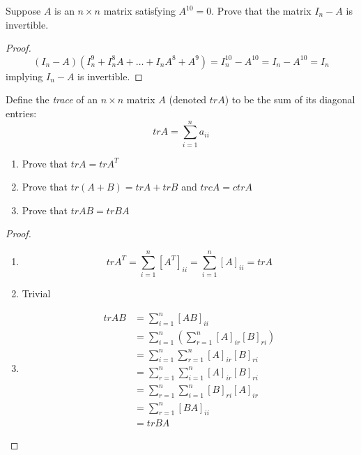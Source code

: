 \begin{exercise} \label{e1.4.21}
    Suppose \( A \) is an \( n \times n \) matrix satisfying \( A^{10} = 0 \). Prove that the matrix \( I_n - A \) is invertible.
    
    \begin{proof}
        \[ (I_n - A)(I_n^9 + I_n^8A + \ldots + I_nA^8 + A^9) = I_n^{10} - A^{10} = I_n - A^{10} = I_n  \]
        implying \( I_n - A \) is invertible.
    \end{proof}
\end{exercise} %

\begin{exercise} \label{e1.4.22}
    Define the \emph{trace} of an \( n \times n \) matrix \( A \) (denoted \( trA \)) to be the sum of its diagonal entries:
    \[ trA = \sum_{i=1}^{n}a_{ii} \]
    
    \begin{enumerate}
        \item Prove that \( trA = trA^T \)
        \item Prove that \( tr(A+B) = trA + trB \) and \( trcA = ctrA\)
        \item Prove that \( trAB = trBA \)
    \end{enumerate}
    
    \begin{proof}
        \begin{enumerate}
            \item 
            \[ trA^T = \sum_{i=1}^n \left[ A^T \right]_{ii} = \sum_{i=1}^n \left[ A \right]_{ii} = trA \]
            
            \item Trivial
            
            \item
                \begin{align*}
                    trAB &= \sum_{i=1}^n \left[ AB \right]_{ii} \\
                    &= \sum_{i=1}^n \left( \sum_{r=1}^n [A]_{ir}[B]_{ri} \right) \\
                    &= \sum_{i=1}^n\sum_{r=1}^n [A]_{ir}[B]_{ri} \\
                    &= \sum_{r=1}^n\sum_{i=1}^n [A]_{ir}[B]_{ri} \\
                    &= \sum_{r=1}^n\sum_{i=1}^n [B]_{ri}[A]_{ir} \\
                    &= \sum_{r=1}^n [BA]_{ii} \\
                    &= trBA
                \end{align*}
        \end{enumerate}
    \end{proof}
\end{exercise} %

